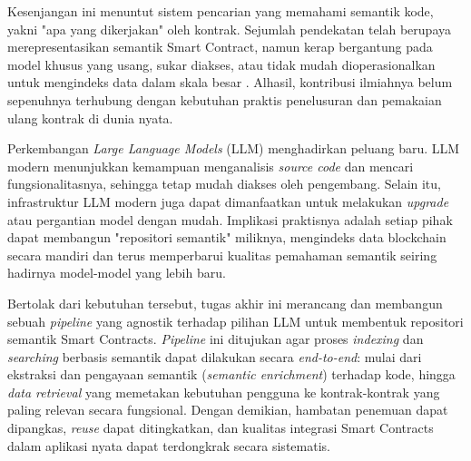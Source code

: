 Kesenjangan ini menuntut sistem pencarian yang memahami semantik kode, yakni "apa yang dikerjakan" oleh kontrak. Sejumlah pendekatan telah berupaya merepresentasikan semantik Smart Contract, namun kerap bergantung pada model khusus yang usang, sukar diakses, atau tidak mudah dioperasionalkan untuk mengindeks data dalam skala besar \parencite{zhang2021smart} \parencite{stan}. Alhasil, kontribusi ilmiahnya belum sepenuhnya terhubung dengan kebutuhan praktis penelusuran dan pemakaian ulang kontrak di dunia nyata.

Perkembangan \textit{Large Language Models} (LLM) menghadirkan peluang baru. LLM modern menunjukkan kemampuan menganalisis \textit{source code} dan mencari fungsionalitasnya, sehingga tetap mudah diakses oleh pengembang. Selain itu, infrastruktur LLM modern juga dapat dimanfaatkan untuk melakukan \textit{upgrade} atau pergantian model dengan mudah. Implikasi praktisnya adalah setiap pihak dapat membangun "repositori semantik" miliknya, mengindeks data blockchain secara mandiri dan terus memperbarui kualitas pemahaman semantik seiring hadirnya model-model yang lebih baru.

Bertolak dari kebutuhan tersebut, tugas akhir ini merancang dan membangun sebuah \textit{pipeline} yang agnostik terhadap pilihan LLM untuk membentuk repositori semantik Smart Contracts. \textit{Pipeline} ini ditujukan agar proses \textit{indexing} dan \textit{searching} berbasis semantik dapat dilakukan secara \textit{end-to-end}: mulai dari ekstraksi dan pengayaan semantik (\textit{semantic enrichment}) terhadap kode, hingga \textit{data retrieval} yang memetakan kebutuhan pengguna ke kontrak-kontrak yang paling relevan secara fungsional. Dengan demikian, hambatan penemuan dapat dipangkas, \textit{reuse} dapat ditingkatkan, dan kualitas integrasi Smart Contracts dalam aplikasi nyata dapat terdongkrak secara sistematis.